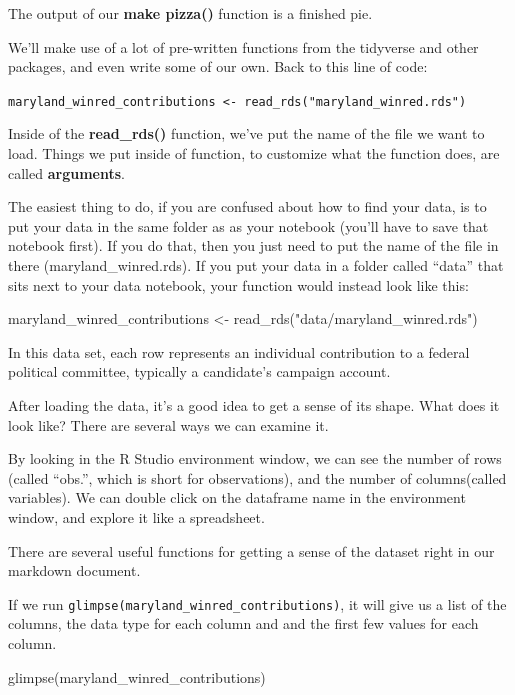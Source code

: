 \documentclass[
  letterpaper,
  DIV=11,
  numbers=noendperiod]{scrreprt}
\newenvironment{Shaded}{\begin{snugshade}}{\end{snugshade}}
\newcommand{\FunctionTok}[1]{\textcolor[rgb]{0.28,0.35,0.67}{#1}}
\newcommand{\NormalTok}[1]{\textcolor[rgb]{0.00,0.23,0.31}{#1}}
\newcommand{\OtherTok}[1]{\textcolor[rgb]{0.00,0.23,0.31}{#1}}
\newcommand{\StringTok}[1]{\textcolor[rgb]{0.13,0.47,0.30}{#1}}
\begin{document}
The output of our \textbf{make pizza()} function is a finished pie.

We'll make use of a lot of pre-written functions from the tidyverse and
other packages, and even write some of our own. Back to this line of
code:

\texttt{maryland\_winred\_contributions\ \textless{}-\ read\_rds("maryland\_winred.rds")}

Inside of the \textbf{read\_rds()} function, we've put the name of the
file we want to load. Things we put inside of function, to customize
what the function does, are called \textbf{arguments}.

The easiest thing to do, if you are confused about how to find your
data, is to put your data in the same folder as as your notebook (you'll
have to save that notebook first). If you do that, then you just need to
put the name of the file in there (maryland\_winred.rds). If you put
your data in a folder called ``data'' that sits next to your data
notebook, your function would instead look like this:

\begin{Shaded}
\begin{Highlighting}[]
\NormalTok{maryland\_winred\_contributions }\OtherTok{\textless{}{-}} \FunctionTok{read\_rds}\NormalTok{(}\StringTok{"data/maryland\_winred.rds"}\NormalTok{)}
\end{Highlighting}
\end{Shaded}

In this data set, each row represents an individual contribution to a
federal political committee, typically a candidate's campaign account.

After loading the data, it's a good idea to get a sense of its shape.
What does it look like? There are several ways we can examine it.

By looking in the R Studio environment window, we can see the number of
rows (called ``obs.'', which is short for observations), and the number
of columns(called variables). We can double click on the dataframe name
in the environment window, and explore it like a spreadsheet.

There are several useful functions for getting a sense of the dataset
right in our markdown document.

If we run \texttt{glimpse(maryland\_winred\_contributions)}, it will
give us a list of the columns, the data type for each column and and the
first few values for each column.

\begin{Shaded}
\begin{Highlighting}[]
\FunctionTok{glimpse}\NormalTok{(maryland\_winred\_contributions)}
\end{Highlighting}
\end{Shaded}
\end{document}
